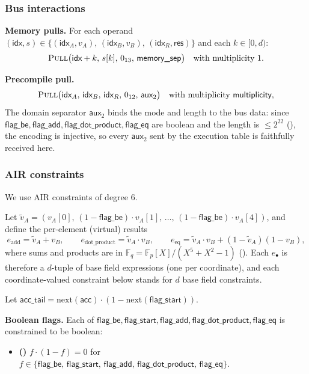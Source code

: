 \documentclass{article}
\theoremstyle{definition}
\newcommand{\Fp}{\mathbb F_p}
\newcommand{\Fq}{\mathbb F_q}
\newcommand{\extdeg}{d} %
\begin{document}
\subsubsection{Bus interactions}

\textbf{Memory pulls.} For each operand $(\textsf{idx}, s) \in \{(\textsf{idx}_A, v_A),\, (\textsf{idx}_B, v_B),\, (\textsf{idx}_R, \textsf{res})\}$ and each $k \in [0, \extdeg)$:
\[
\textsc{Pull}\big(\textsf{idx} + k,\, s[k],\, 0_{13},\, \textsf{memory\_sep}\big) \quad \text{with multiplicity } 1.
\]

\textbf{Precompile pull.}
\[
\textsc{Pull}\big(\textsf{idx}_A,\, \textsf{idx}_B,\, \textsf{idx}_R,\, 0_{12},\, \textsf{aux}_2\big) \quad \text{with multiplicity } \textsf{multiplicity},
\]
The domain separator $\textsf{aux}_2$ binds the mode and length to the bus data: since $\textsf{flag\_be}, \textsf{flag\_add}, \textsf{flag\_dot\_product}, \textsf{flag\_eq}$ are boolean and the length is $\leq 2^{22}$ (), the encoding is injective, so every $\textsf{aux}_2$ sent by the execution table is faithfully received here.


\subsubsection{AIR constraints}

We use AIR constraints of degree 6.

\vspace{2mm}

Let $\tilde v_A = (v_A[0],\, (1 - \textsf{flag\_be}) \cdot v_A[1],\, \dots,\, (1 - \textsf{flag\_be}) \cdot v_A[4])$, and define the per-element (virtual) results
\[
    e_\text{add} = \tilde v_A + v_B, \qquad e_\text{dot\_product} = \tilde v_A \cdot v_B, \qquad e_\text{eq} = \tilde v_A \cdot v_B + (1 - \tilde v_A)(1 - v_B),
\]
where sums and products are in $\Fq = \Fp[X]/(X^5 + X^2 - 1)$ (). Each $e_\bullet$ is therefore a $\extdeg$-tuple of base field expressions (one per coordinate), and each coordinate-valued constraint below stands for $\extdeg$ base field constraints.

Let $\textsf{acc\_tail} = \text{next}(\textsf{acc}) \cdot (1 - \text{next}(\textsf{flag\_start}))$.

\vspace{2mm}

\textbf{Boolean flags.} Each of $\textsf{flag\_be}, \textsf{flag\_start}, \textsf{flag\_add}, \textsf{flag\_dot\_product}, \textsf{flag\_eq}$ is constrained to be boolean:
\begin{itemize}
    \item {}\textbf{(\theequation)}\label{c:bool-flags}\hspace{1mm} $f \cdot (1 - f) = 0$ for $f \in \{\textsf{flag\_be},\, \textsf{flag\_start},\, \textsf{flag\_add},\, \textsf{flag\_dot\_product},\, \textsf{flag\_eq}\}$.
\end{itemize}
\end{document}
